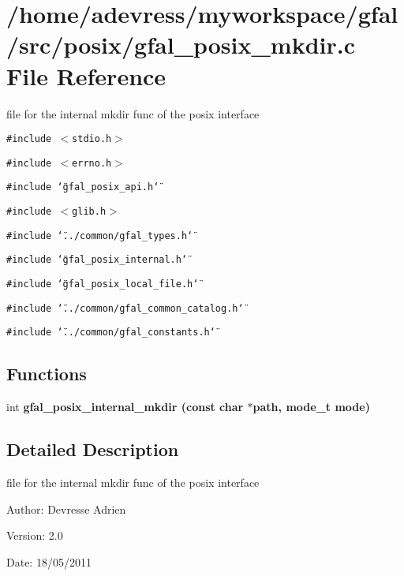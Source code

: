 \section{/home/adevress/myworkspace/gfal/src/posix/gfal\_\-posix\_\-mkdir.c File Reference}
\label{gfal__posix__mkdir_8c}
file for the internal mkdir func of the posix interface 

{\tt \#include $<$stdio.h$>$}\par
{\tt \#include $<$errno.h$>$}\par
{\tt \#include \char`\"{}gfal\_\-posix\_\-api.h\char`\"{}}\par
{\tt \#include $<$glib.h$>$}\par
{\tt \#include \char`\"{}../common/gfal\_\-types.h\char`\"{}}\par
{\tt \#include \char`\"{}gfal\_\-posix\_\-internal.h\char`\"{}}\par
{\tt \#include \char`\"{}gfal\_\-posix\_\-local\_\-file.h\char`\"{}}\par
{\tt \#include \char`\"{}../common/gfal\_\-common\_\-catalog.h\char`\"{}}\par
{\tt \#include \char`\"{}../common/gfal\_\-constants.h\char`\"{}}\par
\subsection*{Functions}
\begin{CompactItemize}
\item 
int \bf{gfal\_\-posix\_\-internal\_\-mkdir} (const char $\ast$path, mode\_\-t mode)
\end{CompactItemize}


\subsection{Detailed Description}
file for the internal mkdir func of the posix interface 

\begin{Desc}
\item[Author:]Devresse Adrien \end{Desc}
\begin{Desc}
\item[Version:]2.0 \end{Desc}
\begin{Desc}
\item[Date:]18/05/2011 \end{Desc}


